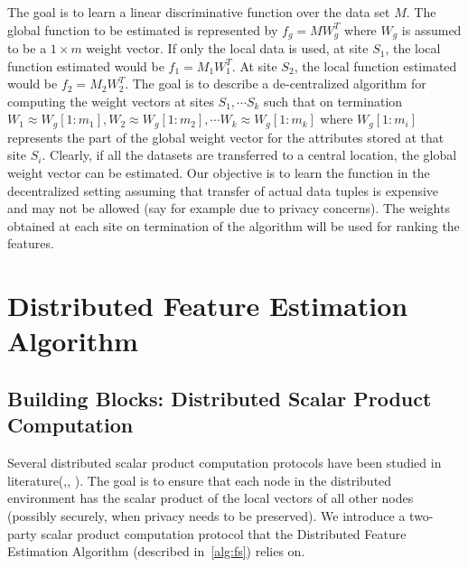 The goal is to learn a linear discriminative function over the data set $M$. The global function to be estimated is represented by $f_{g} = M W_{g}^{T} $ where $W_g$ is assumed to be a $1 \times m$ weight vector. If only the local data is used, at site $S_1$, the local function estimated would be $f_1 = M_1 W_{1}^{T}$. At site $S_2$, the local function estimated would be $f_2 = M_2 W_{2}^{T}$. The goal is to describe a de-centralized algorithm for computing the weight vectors at sites $S_1, \cdots S_k$ such that on termination $W_{1} \approx W_g[1:m_1], W_2 \approx W_g[1:m_2], \cdots W_k \approx W_g[1:m_k]$ where $W_g[1:m_i]$ represents the part of the global weight vector for the attributes stored at that site $S_i$. Clearly, if all the datasets are transferred to a central location, the global weight vector can be estimated. Our objective is to learn the function in the decentralized setting assuming that transfer of actual data tuples is expensive and may not be allowed (say for example due to privacy concerns). The weights obtained at each site on termination of the algorithm will be used for ranking the features. \\




\section{Distributed Feature Estimation Algorithm}
\label{sec:alg}

\subsection{Building Blocks: Distributed Scalar Product Computation}
\label{sec:dotProd}
Several distributed scalar product computation protocols have been studied in literature(\cite{Du_01a},\cite{Du_01b}, \cite{Vaidya_02}). The goal is to ensure that each node in the distributed environment has the scalar product of the local vectors of all other nodes (possibly securely, when privacy needs to be preserved). We introduce a two-party scalar product computation protocol that the Distributed Feature Estimation Algorithm (described in~\ref{alg:fs}) relies on.


